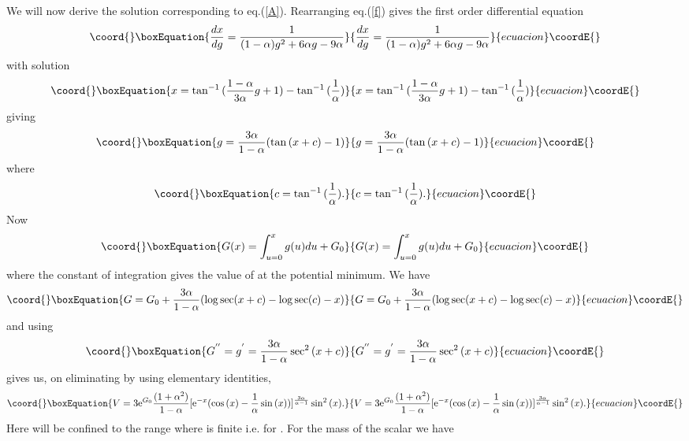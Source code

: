 \documentclass[a4paper,12pt]{article}
\begin{document}
We will now derive the solution corresponding to eq.(\ref{A}).
Rearranging eq.(\ref{f}) gives the first order differential
equation
\begin{equation}\coord{}\boxEquation{\label{x}
    \frac{dx}{dg} = \frac{1}{(1-\alpha)g^{2} + 6\alpha g -9\alpha}
}{\frac{dx}{dg} = \frac{1}{(1-\alpha)g^{2} + 6\alpha g -9\alpha}
}{ecuacion}\coordE{}\end{equation}
with solution
\begin{equation}\coord{}\boxEquation{\label{Sx}
    x = \tan^{-1}{(\frac{1-\alpha}{3\alpha}g + 1)} - \tan^{-1}{(\frac{1}{\alpha})}
}{x = \tan^{-1}{(\frac{1-\alpha}{3\alpha}g + 1)} - \tan^{-1}{(\frac{1}{\alpha})}
}{ecuacion}\coordE{}\end{equation}
giving
\begin{equation}\coord{}\boxEquation{\label{Sg}
    g = \frac{3\alpha}{1-\alpha}(\tan{(x+c)-1)}
}{g = \frac{3\alpha}{1-\alpha}(\tan{(x+c)-1)}
}{ecuacion}\coordE{}\end{equation}
where
\begin{equation}\coord{}\boxEquation{\label{c}
    c =  \tan^{-1}{(\frac{1}{\alpha})}.
}{c =  \tan^{-1}{(\frac{1}{\alpha})}.
}{ecuacion}\coordE{}\end{equation}
Now
\begin{equation}\coord{}\boxEquation{\label{G}
    G(x) = \int_{u = 0}^{x}g(u) du + G_{0}
}{G(x) = \int_{u = 0}^{x}g(u) du + G_{0}
}{ecuacion}\coordE{}\end{equation}
where the constant of integration \coordHE{} gives the value of
\coordHE{} at the potential minimum. We have
\begin{equation}\coord{}\boxEquation{\label{SG}
    G = G_{0}  + \frac{3\alpha}{1-
    \alpha}(\log \sec (x+c) - \log \sec (c)-x)
}{G = G_{0}  + \frac{3\alpha}{1-
    \alpha}(\log \sec (x+c) - \log \sec (c)-x)
}{ecuacion}\coordE{}\end{equation}
and using
\begin{equation}\coord{}\boxEquation{\label{Gp}
G^{''} = g^{'} = \frac{3\alpha}{1-\alpha}\sec^{2}{(x+c)}
}{G^{''} = g^{'} = \frac{3\alpha}{1-\alpha}\sec^{2}{(x+c)}
}{ecuacion}\coordE{}\end{equation}
gives us, on eliminating \coordHE{} by using elementary identities,
\begin{equation}\coord{}\boxEquation{\label{SV2}
    V =3 \mathrm{e}^{G_{0}}\frac{(1+ \alpha^{2})}{1 - \alpha}[\mathrm{e}^{-x}(\cos{(x)} - \frac{1}{\alpha}\sin{(x)})]^{\frac{
    3\alpha}{\alpha -1}}\sin^{2}{(x)}.
}{V =3 \mathrm{e}^{G_{0}}\frac{(1+ \alpha^{2})}{1 - \alpha}[\mathrm{e}^{-x}(\cos{(x)} - \frac{1}{\alpha}\sin{(x)})]^{\frac{
    3\alpha}{\alpha -1}}\sin^{2}{(x)}.
}{ecuacion}\coordE{}\end{equation}
Here \coordHE{} will be confined to the range where \coordHE{} is finite i.e.
\coordHE{} for \coordHE{}. For the mass of the
scalar \coordHE{} we have
\end{document}
